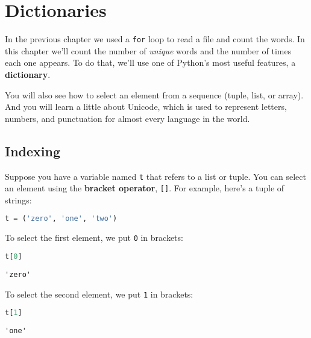 \chapter{Dictionaries}\label{dictionaries}

In the previous chapter we used a \passthrough{\lstinline!for!} loop to
read a file and count the words. In this chapter we'll count the number
of \emph{unique} words and the number of times each one appears. To do
that, we'll use one of Python's most useful features, a
\textbf{dictionary}.

You will also see how to select an element from a sequence (tuple, list,
or array). And you will learn a little about Unicode, which is used to
represent letters, numbers, and punctuation for almost every language in
the world.

\section{Indexing}\label{indexing}

Suppose you have a variable named \passthrough{\lstinline!t!} that
refers to a list or tuple. You can select an element using the
\textbf{bracket operator}, \passthrough{\lstinline![]!}. For example,
here's a tuple of strings:

\begin{lstlisting}[language=Python,style=source]
t = ('zero', 'one', 'two')
\end{lstlisting}

To select the first element, we put \passthrough{\lstinline!0!} in
brackets:

\begin{lstlisting}[language=Python,style=source]
t[0]
\end{lstlisting}

\begin{lstlisting}[style=output]
'zero'
\end{lstlisting}

\pagebreak

To select the second element, we put \passthrough{\lstinline!1!} in
brackets:

\begin{lstlisting}[language=Python,style=source]
t[1]
\end{lstlisting}

\begin{lstlisting}[style=output]
'one'
\end{lstlisting}

